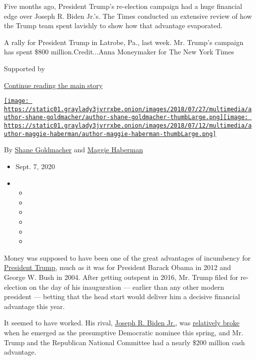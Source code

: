 Five months ago, President Trump's re-election campaign had a huge
financial edge over Joseph R. Biden Jr.'s. The Times conducted an
extensive review of how the Trump team spent lavishly to show how that
advantage evaporated.

A rally for President Trump in Latrobe, Pa., last week. Mr. Trump's
campaign has spent \$800 million.Credit...Anna Moneymaker for The New
York Times

Supported by

\protect\hyperlink{after-sponsor}{Continue reading the main story}

\href{https://www.nytimes3xbfgragh.onion/by/shane-goldmacher}{\texttt{[image: https://static01.graylady3jvrrxbe.onion/images/2018/07/27/multimedia/author-shane-goldmacher/author-shane-goldmacher-thumbLarge.png]}}\href{https://www.nytimes3xbfgragh.onion/by/maggie-haberman}{\texttt{[image: https://static01.graylady3jvrrxbe.onion/images/2018/07/12/multimedia/author-maggie-haberman/author-maggie-haberman-thumbLarge.png]}}

By \href{https://www.nytimes3xbfgragh.onion/by/shane-goldmacher}{Shane
Goldmacher} and
\href{https://www.nytimes3xbfgragh.onion/by/maggie-haberman}{Maggie
Haberman}

\begin{itemize}
\item
  Sept. 7, 2020
\item
  \begin{itemize}
  \item
  \item
  \item
  \item
  \item
  \item
  \end{itemize}
\end{itemize}

Money was supposed to have been one of the great advantages of
incumbency for
\href{https://www.nytimes3xbfgragh.onion/interactive/2020/us/elections/donald-trump.html}{President
Trump}, much as it was for President Barack Obama in 2012 and George W.
Bush in 2004. After getting outspent in 2016, Mr. Trump filed for
re-election on the day of his inauguration --- earlier than any other
modern president --- betting that the head start would deliver him a
decisive financial advantage this year.

It seemed to have worked. His rival,
\href{https://www.nytimes3xbfgragh.onion/interactive/2020/us/elections/joe-biden.html}{Joseph
R. Biden Jr.}, was
\href{https://www.nytimes3xbfgragh.onion/2020/04/21/us/politics/biden-2020-fundraising.html}{relatively
broke} when he emerged as the presumptive Democratic nominee this
spring, and Mr. Trump and the Republican National Committee had a nearly
\$200 million cash advantage.

